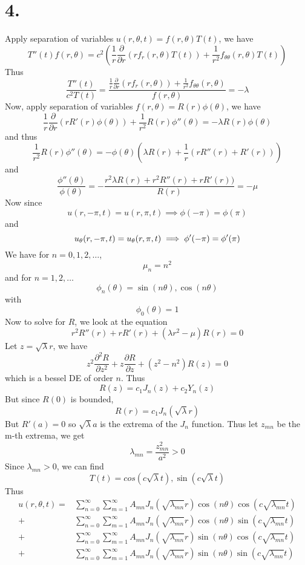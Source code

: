 \documentclass[11pt]{article}
\theoremstyle{mystyle}
\theoremstyle{definition}
\begin{document}
\section*{4.}
Apply separation of variables $u(r, \theta, t) = f(r, \theta) T(t)$, we have 
\[
  T''(t) f(r, \theta) = c^2 \left(\displaystyle\frac{1}{r} \displaystyle\frac{\partial}{\partial r} \left( r f_r(r, \theta) T(t)\right) + \displaystyle\frac{1}{r^2} f_{\theta \theta}(r, \theta)T(t)\right)
\]
Thus 
\[
  \displaystyle\frac{T''(t)}{c^2 T(t)} = \displaystyle\frac{\displaystyle\frac{1}{r} \displaystyle\frac{\partial}{\partial r} (r f_r(r, \theta)) + \displaystyle\frac{1}{r^2}f_{\theta \theta}(r, \theta)}{f(r, \theta)} = -\lambda
\]
Now, apply separation of variables $f(r, \theta) = R(r) \phi(\theta)$, we have 
\[
  \displaystyle\frac{1}{r} \displaystyle\frac{\partial}{\partial r} (rR'(r) \phi(\theta)) + \displaystyle\frac{1}{r^2} R(r) \phi''(\theta) = - \lambda R(r) \phi(\theta) 
\]
and thus 
\[
  \displaystyle\frac{1}{r^2} R(r) \phi''(\theta) = - \phi(\theta) \left(\lambda R(r) + \displaystyle\frac{1}{r} (rR''(r) + R'(r)) \right)
\]
and 
\[
  \displaystyle\frac{\phi''(\theta)}{\phi(\theta)} = -\displaystyle\frac{ r^2\lambda R(r) + r^2R''(r) + rR'(r))}{R(r)} =  -\mu 
\]
Now since 
\[
  u(r, -\pi, t) = u(r, \pi, t) \implies \phi(-\pi) = \phi(\pi) 
\]
and 
\[
  u_\theta(r, -\pi, t) = u_\theta(r, \pi, t) \implies \phi'(-\pi) = \phi'(\pi) \\
\]
We have for $n = 0,1,2, \hdots$, 
\[
  \mu_n = n^2 
\]
and for $n=1,2,\hdots$
\[
  \phi_n(\theta) = \sin(n\theta), \cos(n\theta)
\]
with 
\[
  \phi_0(\theta) = 1
\]
Now to solve for $R$, we look at the equation 
\[
  r^2R''(r) + rR'(r) + \left(\lambda r^2 - \mu \right) R(r) = 0
\]
Let $z = \sqrt{\lambda }r$, we have 
\[
  z^2\displaystyle\frac{\partial^2 R}{\partial z^2} + z \displaystyle\frac{\partial R}{\partial z} + \left(z^2 - n^2 \right) R(z) = 0
\]
which is a bessel DE of order $n$. Thus 
\[
  R(z) = c_1 J_n(z) + c_2 Y_n(z)
\]
But since $R(0)$ is bounded, 
\[
  R(r) = c_1 J_n(\sqrt{\lambda }r) 
\]
But $R'(a) = 0$ so $\sqrt{\lambda} a$ is the extrema of the $J_n$ function. Thus let $z_{mn}$ be the m-th extrema, we get 
\[
  \lambda_{mn} = \displaystyle\frac{z^2_{mn}}{a^2} > 0
\]
Since $\lambda_{mn} > 0$, we can find 
\[
  T(t) = cos( c\sqrt{\lambda}t), \sin(c\sqrt{\lambda}t)
\]
Thus 
\begin{align*}
  u(r, \theta, t) 
  =& \sum_{n=0}^\infty \sum_{m=1}^\infty A_{mn} J_n(\sqrt{\lambda_{mn}}r) \cos(n \theta) \cos(c \sqrt{\lambda_{mn}}t) \\
  +&\sum_{n=0}^\infty \sum_{m=1}^\infty A_{mn} J_n(\sqrt{\lambda_{mn}}r) \cos(n \theta) \sin(c \sqrt{\lambda_{mn}}t) \\
  +&\sum_{n=0}^\infty \sum_{m=1}^\infty A_{mn} J_n(\sqrt{\lambda_{mn}}r) \sin(n \theta) \cos(c \sqrt{\lambda_{mn}}t) \\
  +&\sum_{n=0}^\infty \sum_{m=1}^\infty A_{mn} J_n(\sqrt{\lambda_{mn}}r) \sin(n \theta) \sin(c \sqrt{\lambda_{mn}}t)
\end{align*}
\newpage
\end{document}
